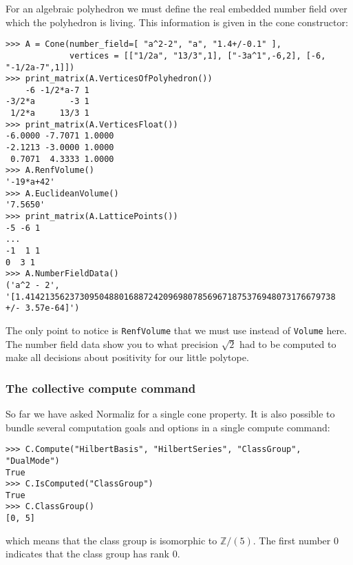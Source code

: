 \documentclass[12pt,a4paper]{scrartcl}
\theoremstyle{definition}
\def\ZZ{{\mathbb Z}}
\begin{document}
\begin{small}
For an algebraic polyhedron we must define the real embedded number field over which the polyhedron is living. This information is given in the cone constructor:
\begin{Verbatim}
>>> A = Cone(number_field=[ "a^2-2", "a", "1.4+/-0.1" ], 
             vertices = [["1/2a", "13/3",1], ["-3a^1",-6,2], [-6, "-1/2a-7",1]])
>>> print_matrix(A.VerticesOfPolyhedron())
    -6 -1/2*a-7 1
-3/2*a       -3 1
 1/2*a     13/3 1
>>> print_matrix(A.VerticesFloat())
-6.0000 -7.7071 1.0000
-2.1213 -3.0000 1.0000
 0.7071  4.3333 1.0000
>>> A.RenfVolume()
'-19*a+42'
>>> A.EuclideanVolume()
'7.5650'
>>> print_matrix(A.LatticePoints())
-5 -6 1
...
-1  1 1
0  3 1
>>> A.NumberFieldData()
('a^2 - 2', '[1.414213562373095048801688724209698078569671875376948073176679738 +/- 3.57e-64]')
\end{Verbatim}

The only point to notice is \verb|RenfVolume| that we must use instead of \verb|Volume| here. The number field data show you to what precision $\sqrt2$ had to be computed to make all decisions about positivity for our little polytope.

\subsubsection{The collective compute command}
So far we have asked Normaliz for a single cone property. It is also possible to bundle several computation goals and options in a single compute command:
\begin{Verbatim}
>>> C.Compute("HilbertBasis", "HilbertSeries", "ClassGroup", "DualMode")
True
>>> C.IsComputed("ClassGroup")
True
>>> C.ClassGroup()
[0, 5]
\end{Verbatim}
which means that the class group is isomorphic to $\ZZ/(5)$. The first number $0$ indicates that the class group has rank $0$.


\end{small}
\end{document}
